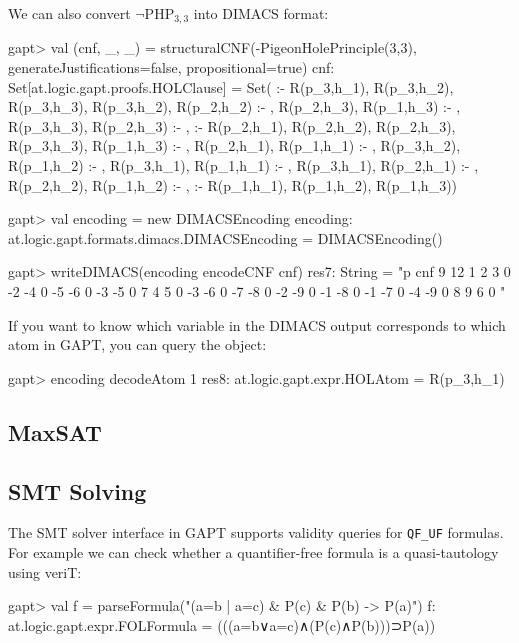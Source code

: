 \documentclass[a4paper,11pt]{article}
\newcommand{\cli}[1]{{\ttfamily {#1}}}
\begin{document}
We can also convert $\neg\mathrm{PHP}_{3,3}$ into DIMACS format:
\begin{clilisting}
gapt> val (cnf, _, _) = structuralCNF(-PigeonHolePrinciple(3,3), generateJustifications=false, propositional=true)
cnf: Set[at.logic.gapt.proofs.HOLClause] = Set( :- R(p_3,h_1), R(p_3,h_2), R(p_3,h_3), R(p_3,h_2), R(p_2,h_2) :- , R(p_2,h_3), R(p_1,h_3) :- , R(p_3,h_3), R(p_2,h_3) :- ,  :- R(p_2,h_1), R(p_2,h_2), R(p_2,h_3), R(p_3,h_3), R(p_1,h_3) :- , R(p_2,h_1), R(p_1,h_1) :- , R(p_3,h_2), R(p_1,h_2) :- , R(p_3,h_1), R(p_1,h_1) :- , R(p_3,h_1), R(p_2,h_1) :- , R(p_2,h_2), R(p_1,h_2) :- ,  :- R(p_1,h_1), R(p_1,h_2), R(p_1,h_3))

gapt> val encoding = new DIMACSEncoding
encoding: at.logic.gapt.formats.dimacs.DIMACSEncoding = DIMACSEncoding()

gapt> writeDIMACS(encoding encodeCNF cnf)
res7: String =
"p cnf 9 12
1 2 3 0
-2 -4 0
-5 -6 0
-3 -5 0
7 4 5 0
-3 -6 0
-7 -8 0
-2 -9 0
-1 -8 0
-1 -7 0
-4 -9 0
8 9 6 0
"

\end{clilisting}

If you want to know which variable in the DIMACS output corresponds to which
atom in GAPT, you can query the \cli{DIMACSEncoding} object:
\begin{clilisting}
gapt> encoding decodeAtom 1
res8: at.logic.gapt.expr.HOLAtom = R(p_3,h_1)

\end{clilisting}


\subsection{MaxSAT}


\subsection{SMT Solving}

The SMT solver interface in GAPT supports validity queries for \verb,QF_UF,
formulas.  For example we can check whether a quantifier-free formula is a
quasi-tautology using veriT:
\begin{clilisting}
gapt> val f = parseFormula("(a=b | a=c) & P(c) & P(b) -> P(a)")
f: at.logic.gapt.expr.FOLFormula = (((a=b∨a=c)∧(P(c)∧P(b)))⊃P(a))

\end{clilisting}
\end{document}

